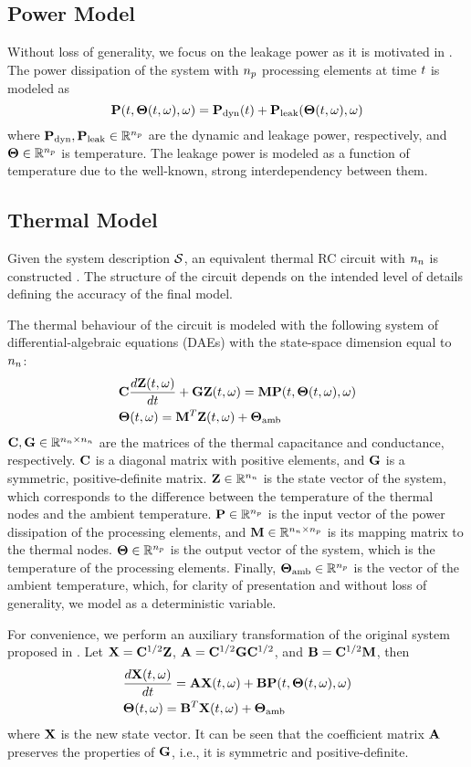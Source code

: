 \subsection{Power Model} 
Without loss of generality, we focus on the leakage power as it is motivated in . The power dissipation of the system with ${n_p}$ processing elements at time $t$ is modeled as
\[
  \mathbf{P}(t, {\boldsymbol\Theta}(t, \omega), \omega) = \mathbf{P}_{\text{dyn}}(t) + \mathbf{P}_{\text{leak}}({\boldsymbol\Theta}(t, \omega), \omega)
\]
where $\mathbf{P}_{\text{dyn}}, \mathbf{P}_{\text{leak}} \in \mathbb{R}^{n_p}$ are the dynamic and leakage power, respectively, and ${\boldsymbol\Theta} \in \mathbb{R}^{n_p}$ is temperature. The leakage power is modeled as a function of temperature due to the well-known, strong interdependency between them.

\subsection{Thermal Model} 
Given the system description $\mathcal{S}$, an equivalent thermal RC circuit with ${n_n}$  is constructed \cite{kreith2000}. The structure of the circuit depends on the intended level of details defining the accuracy of the final model.

The thermal behaviour of the circuit is modeled with the following system of differential-algebraic equations (DAEs) with the state-space dimension equal to ${n_n}$:
\begin{align*}
  & \mC \frac{d\vTI(\t, \o)}{d\t} + \mG \vTI(\t, \o) = \mM \vP(\t, \vTO(\t, \o), \o) \\
  & \vTO(\t, \o) = \mM^T \vTI(\t, \o) + \vTO_\amb
\end{align*}
$\mC, \mG \in \real^{\nodes \times \nodes}$ are the matrices of the thermal capacitance and conductance, respectively. $\mC$ is a diagonal matrix with positive elements, and $\mG$ is a symmetric, positive-definite matrix. $\mathbf{Z} \in \mathbb{R}^{n_n}$ is the state vector of the system, which corresponds to the difference between the temperature of the thermal nodes and the ambient temperature. $\mathbf{P} \in \mathbb{R}^{n_p}$ is the input vector of the power dissipation of the processing elements, and $\mM \in \real^{\nodes \times \cores}$ is its mapping matrix to the thermal nodes. ${\boldsymbol\Theta} \in \mathbb{R}^{n_p}$ is the output vector of the system, which is the temperature of the processing elements. Finally, ${\boldsymbol\Theta}_{\text{amb}} \in \mathbb{R}^{n_p}$ is the vector of the ambient temperature, which, for clarity of presentation and without loss of generality, we model as a deterministic variable.

For convenience, we perform an auxiliary transformation of the original system proposed in \cite{ukhov2012}. Let $\vX = \mC^{1/2} \vTI$, $\mA = \mC^{1/2} \mG \mC^{1/2}$, and $\mB = \mC^{1/2} \mM$, then
\begin{align}
  & \frac{d\vX(\t, \o)}{d\t} = \mA \vX(\t, \o) + \mB \vP(\t, \vTO(\t, \o), \o) \elabel{fourier} \\
  & \vTO(\t, \o) = \mB^T \vX(\t, \o) + \vTO_\amb \nonumber
\end{align}
where $\mathbf{X}$ is the new state vector. It can be seen that the coefficient matrix $\mA$ preserves the properties of $\mG$, i.e., it is symmetric and positive-definite.
